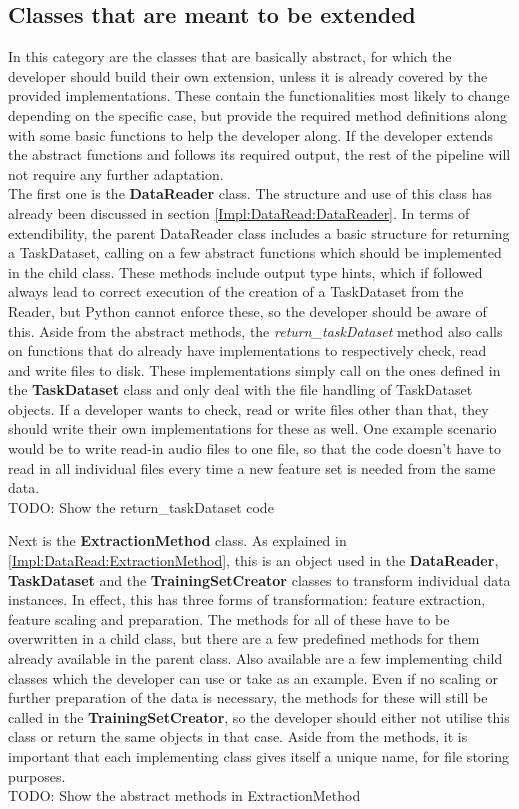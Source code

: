 \subsection{Classes that are meant to be extended}

In this category are the classes that are basically abstract, for which the developer should build their own extension, unless it is already covered by the provided implementations. These contain the functionalities most likely to change depending on the specific case, but provide the required method definitions along with some basic functions to help the developer along. If the developer extends the abstract functions and follows its required output, the rest of the pipeline will not require any further adaptation. \\

The first one is the \textbf{DataReader} class. The structure and use of this class has already been discussed in section \ref{Impl:DataRead:DataReader}. In terms of extendibility, the parent DataReader class includes a basic structure for returning a TaskDataset, calling on a few abstract functions which should be implemented in the child class. These methods include output type hints, which if followed always lead to correct execution of the creation of a TaskDataset from the Reader, but Python cannot enforce these, so the developer should be aware of this. Aside from the abstract methods, the \textit{return\_taskDataset} method also calls on functions that do already have implementations to respectively check, read and write files to disk. These implementations simply call on the ones defined in the \textbf{TaskDataset} class and only deal with the file handling of TaskDataset objects. If a developer wants to check, read or write files other than that, they should write their own implementations for these as well. One example scenario would be to write read-in audio files to one file, so that the code doesn't have to read in all individual files every time a new feature set is needed from the same data.\\
TODO: Show the return\_taskDataset code


Next is the \textbf{ExtractionMethod} class. As explained in \ref{Impl:DataRead:ExtractionMethod}, this is an object used in the \textbf{DataReader}, \textbf{TaskDataset} and the \textbf{TrainingSetCreator} classes to transform individual data instances. In effect, this has three forms of transformation: feature extraction, feature scaling and preparation. The methods for all of these have to be overwritten in a child class, but there are a few predefined methods for them already available in the parent class. Also available are a few implementing child classes which the developer can use or take as an example. Even if no scaling or further preparation of the data is necessary, the methods for these will still be called in the \textbf{TrainingSetCreator}, so the developer should either not utilise this class or return the same objects in that case. Aside from the methods, it is important that each implementing class gives itself a unique name, for file storing purposes.\\
TODO: Show the abstract methods in ExtractionMethod

